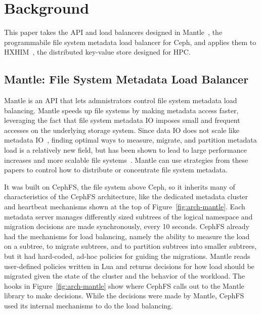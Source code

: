 \section{Background}

This paper takes the API and load balancers designed in
Mantle~\cite{sevilla:sc15-mantle}, the programmabile file system metadata load
balancer for Ceph, and applies them to
HXHIM~\cite{greenberg:hotstorage2015-mdhim}, the distributed key-value store
designed for HPC.

\subsection{Mantle: File System Metadata Load Balancer}
\label{sec:mantle}

Mantle is an API that lets admnistrators control file system metadata load
balancing. Mantle speeds up file systems by making metadata access faster,
leveraging the fact that file system metadata IO imposes small and frequent
accesses on the underlying storage system. Since data IO does not scale like
metadata IO~\cite{roselli:atec2000-FS-workloads}, finding optimal ways to
measure, migrate, and partition metadata load is a relatively new field, but
has been shown to lead to large performance increases and more scalable file
systems~\cite{zheng:pdsw2014-batchfs, grider:pdsw2015-marfs,
ren:sc2014-indexfs, patil:fast2011-giga+, brandt:msst2003-lh}.  Mantle can use
strategies from these papers to control how to distribute or concentrate file
system metadata.

It was built on CephFS, the file system above Ceph, so it inherits many of
characteristics of the CephFS architecture, like the dedicated metadata cluster
and heartbeat mechanisms shown at the top of Figure~\ref{fig:arch-mantle}.
Each metadata server manages differently sized subtrees of the logical
namespace and migration decisions are made synchronously, every 10 seconds.
CephFS already had the mechanisms for load balancing, namely the ability to
measure the load on a subtree, to migrate subtrees, and to partition subtrees
into smaller subtrees, but it had hard-coded, ad-hoc policies for guiding the
migrations.  Mantle reads user-defined policies written in Lua and returns
decisions for how load should be migrated given the state of the cluster and
the behavior of the workload. The hooks in Figure~\ref{fig:arch-mantle} show
where CephFS calls out to the Mantle library to make decisions. While the
decisions were made by Mantle, CephFS used its internal mechanisms to do the
load balancing.

